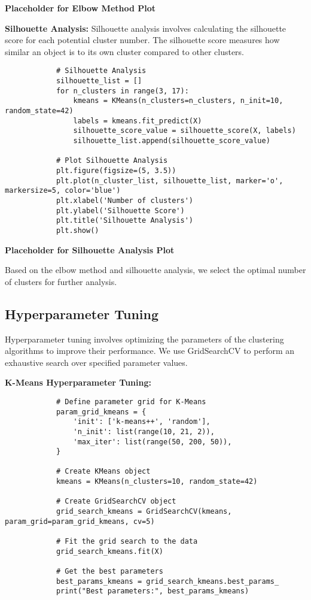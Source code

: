         \textbf{Placeholder for Elbow Method Plot}

        \textbf{Silhouette Analysis:} Silhouette analysis involves calculating the silhouette score for each potential cluster number. The silhouette score measures how similar an object is to its own cluster compared to other clusters.

        \begin{verbatim}
            # Silhouette Analysis
            silhouette_list = []
            for n_clusters in range(3, 17):
                kmeans = KMeans(n_clusters=n_clusters, n_init=10, random_state=42)
                labels = kmeans.fit_predict(X)
                silhouette_score_value = silhouette_score(X, labels)
                silhouette_list.append(silhouette_score_value)
            
            # Plot Silhouette Analysis
            plt.figure(figsize=(5, 3.5))
            plt.plot(n_cluster_list, silhouette_list, marker='o', markersize=5, color='blue')
            plt.xlabel('Number of clusters')
            plt.ylabel('Silhouette Score')
            plt.title('Silhouette Analysis')
            plt.show()
        \end{verbatim}

        \textbf{Placeholder for Silhouette Analysis Plot}

        Based on the elbow method and silhouette analysis, we select the optimal number of clusters for further analysis.
            
    \subsection{Hyperparameter Tuning}
    
        Hyperparameter tuning involves optimizing the parameters of the clustering algorithms to improve their performance. We use GridSearchCV to perform an exhaustive search over specified parameter values.

        \textbf{K-Means Hyperparameter Tuning:}

        \begin{verbatim}
            # Define parameter grid for K-Means
            param_grid_kmeans = {
                'init': ['k-means++', 'random'],
                'n_init': list(range(10, 21, 2)),
                'max_iter': list(range(50, 200, 50)),
            }
            
            # Create KMeans object
            kmeans = KMeans(n_clusters=10, random_state=42)
            
            # Create GridSearchCV object
            grid_search_kmeans = GridSearchCV(kmeans, param_grid=param_grid_kmeans, cv=5)
            
            # Fit the grid search to the data
            grid_search_kmeans.fit(X)
            
            # Get the best parameters
            best_params_kmeans = grid_search_kmeans.best_params_
            print("Best parameters:", best_params_kmeans)
        \end{verbatim}


